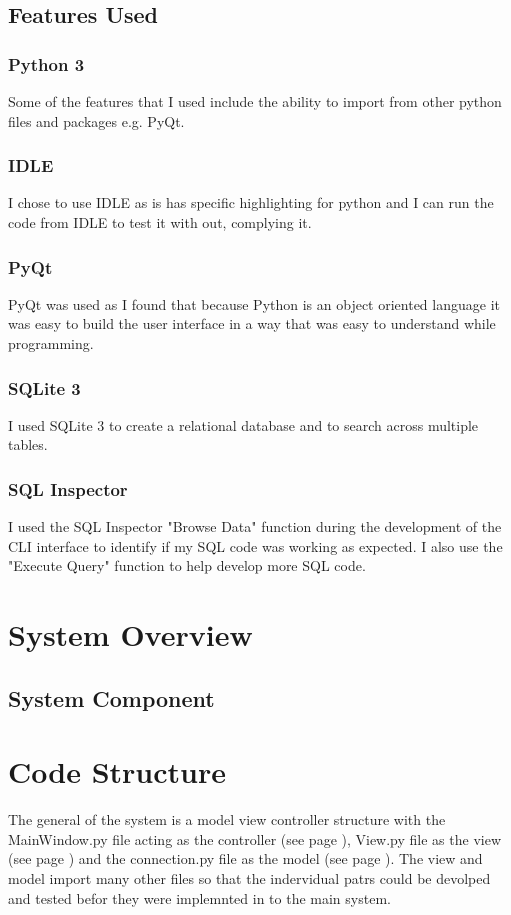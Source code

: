 \subsection{Features Used}
\subsubsection{Python 3}
Some of the features that I used include the ability to import from other python files and packages e.g. PyQt.
\subsubsection{IDLE}
I chose to use IDLE as is has specific highlighting for python and I can run the code from IDLE to test it with out, complying it.
\subsubsection{PyQt}
PyQt was used as I found that because Python is an object oriented language it was easy to build the user interface in a way that was easy to understand while programming.
\subsubsection{SQLite 3}
I used SQLite 3 to create a relational database and to search across multiple tables.
\subsubsection{SQL Inspector}
I used the SQL Inspector "Browse Data" function during the development of the CLI interface to identify if my SQL code was working as expected. I also use the "Execute Query" function to help develop more SQL code.

\section{System Overview}

\subsection{System Component}

\section{Code Structure}
The general of the system is a model view controller structure with the MainWindow.py file acting as the controller (see page \pageref{fig:MW.py}), View.py file as the view (see page \pageref{fig:Con.py}) and the connection.py file as the model (see page \pageref{fig:View.py}). The view and model import many other files so that the indervidual patrs could be devolped and tested befor they were implemnted in to the main system.

